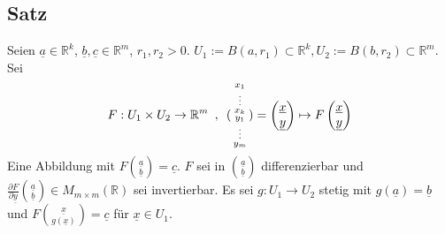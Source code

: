 \subsection{Satz} %
\label{sub:82}
Seien $\underline{a} \in \mathds{R}^k$, $\underline{b},\underline{c} \in \mathds{R}^m$, $r_1, r_2 >0$. $U_1 := B(a,r_1) \subset \mathds{R}^k, U_2 := B(b,r_2) \subset \mathds{R}^m$.
Sei  
\[
	F : U_1 \times U_2 \to \mathbb{R}^m \enspace, \enspace(\begin{smallmatrix}
		x_1 \\ \vdots \\ x_k \\ y_1 \\ \vdots \\ y_m
	\end{smallmatrix}) = \begin{pmatrix}
		\underline{x} \\ \underline{y}
	\end{pmatrix} \mapsto F \begin{pmatrix}
		\underline{x} \\ \underline{y}
	\end{pmatrix}
\]
Eine Abbildung mit $F \binom{\underline{a}}{\underline{b}}=\underline{c}$. $F$ sei in $\binom{\underline{a}}{\underline{b}}$ differenzierbar und 
$\frac{\partial F}{\partial \underline{y}} \binom{\underline{a}}{\underline{b}} \in M_{m \times m}(\mathds{R}) $ sei invertierbar. Es sei $g : U_1  \to U_2$ stetig mit
$g(\underline{a})=\underline{b}$ und $F \binom{\underline{x}}{g(\underline{x})}=\underline{c}$ für $\underline{x}\in U_1$. 

